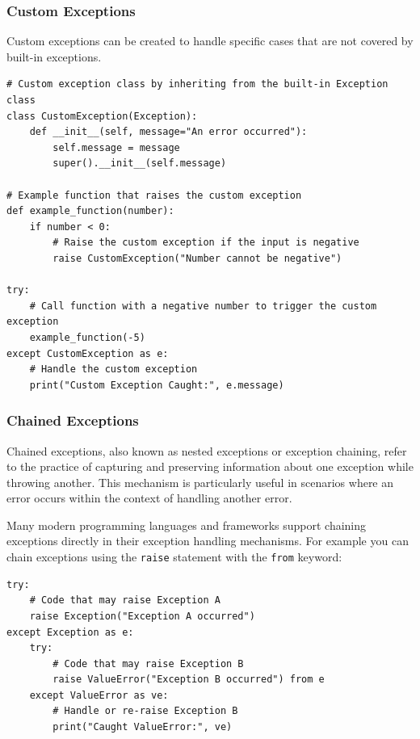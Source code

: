 \subsubsection{Custom Exceptions}
Custom exceptions can be created to handle specific cases that are not covered by built-in exceptions.
\begin{codebox}
\begin{verbatim}
# Custom exception class by inheriting from the built-in Exception class
class CustomException(Exception):
    def __init__(self, message="An error occurred"):
        self.message = message
        super().__init__(self.message)

# Example function that raises the custom exception
def example_function(number):
    if number < 0:
        # Raise the custom exception if the input is negative
        raise CustomException("Number cannot be negative")

try:
    # Call function with a negative number to trigger the custom exception
    example_function(-5)
except CustomException as e:
    # Handle the custom exception
    print("Custom Exception Caught:", e.message)
\end{verbatim}
\end{codebox}

\subsubsection{Chained Exceptions}
Chained exceptions, also known as nested exceptions or exception chaining, refer to the practice of capturing and preserving information about one exception while throwing another. This mechanism is particularly useful in scenarios where an error occurs within the context of handling another error.

Many modern programming languages and frameworks support chaining exceptions directly in their exception handling mechanisms. For example you can chain exceptions using the \texttt{raise} statement with the \texttt{from} keyword:

\begin{codebox}
\begin{verbatim}
try:
    # Code that may raise Exception A
    raise Exception("Exception A occurred")
except Exception as e:
    try:
        # Code that may raise Exception B
        raise ValueError("Exception B occurred") from e
    except ValueError as ve:
        # Handle or re-raise Exception B
        print("Caught ValueError:", ve)
\end{verbatim}
\end{codebox}

